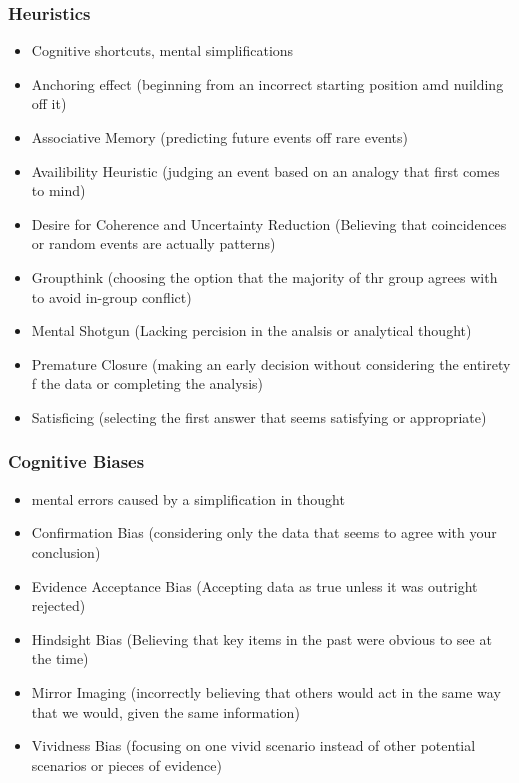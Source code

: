 \documentclass[11pt]{article}
\begin{document}
\subsubsection{Heuristics}
\label{sec:orga8c0c6b}
\begin{itemize}
\item Cognitive shortcuts, mental simplifications
\item Anchoring effect (beginning from an incorrect starting position amd nuilding off it)
\item Associative Memory (predicting future events off rare events)
\item Availibility Heuristic (judging an event based on an analogy that first comes to mind)
\item Desire for Coherence and Uncertainty Reduction (Believing that coincidences or random events are actually patterns)
\item Groupthink (choosing the option that the majority of thr group agrees with to avoid in-group conflict)
\item Mental Shotgun (Lacking percision in the analsis or analytical thought)
\item Premature Closure (making an early decision without considering the entirety f the data or completing the analysis)
\item Satisficing (selecting the first answer that seems satisfying or appropriate)
\end{itemize}
\subsubsection{Cognitive Biases}
\label{sec:org56719c8}
\begin{itemize}
\item mental errors caused by a simplification in thought
\item Confirmation Bias (considering only the data that seems to agree with your conclusion)
\item Evidence Acceptance Bias (Accepting data as true unless it was outright rejected)
\item Hindsight Bias (Believing that key items in the past were obvious to see at the time)
\item Mirror Imaging (incorrectly believing that others would act in the same way that we would, given the same information)
\item Vividness Bias (focusing on one vivid scenario instead of other potential scenarios or pieces of evidence)
\end{itemize}
\end{document}
